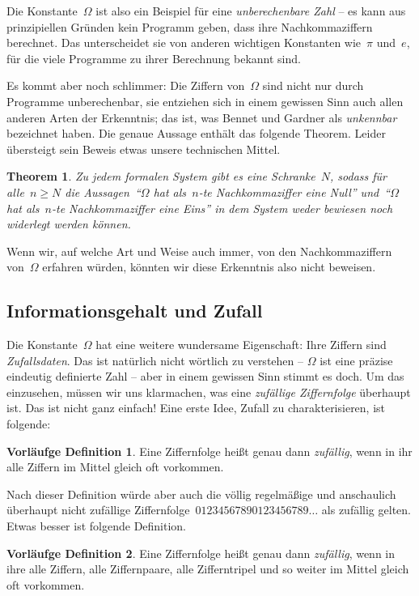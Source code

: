 \documentclass[twoside]{../zirkelblatt1415}
\theoremstyle{definition}
\newtheorem{defn'}{Vorläufge Definition}[section]
\theoremstyle{plain}
\newtheorem{thm}[defn]{Theorem}
\theoremstyle{remark}
\begin{document}
Die Konstante~$\Omega$ ist also ein Beispiel für eine \emph{unberechenbare
Zahl} -- es kann aus prinzipiellen Gründen kein Programm geben, dass ihre
Nachkommaziffern berechnet. Das unterscheidet sie von anderen wichtigen
Konstanten wie~$\pi$ und~$e$, für die viele Programme zu ihrer Berechnung
bekannt sind.

Es kommt aber noch schlimmer: Die Ziffern von~$\Omega$ sind nicht nur durch
Programme unberechenbar, sie entziehen sich in einem gewissen Sinn auch allen
anderen Arten der Erkenntnis; das ist, was Bennet und Gardner als
\emph{unkennbar} bezeichnet haben. Die genaue Aussage enthält das folgende
Theorem. Leider übersteigt sein Beweis etwas unsere technischen Mittel.

\begin{thm}Zu jedem formalen System gibt es eine Schranke~$N$, sodass für
alle~$n \geq N$ die Aussagen~"`$\Omega$ hat als~$n$-te Nachkommaziffer eine
Null"' und~"`$\Omega$ hat als~$n$-te Nachkommaziffer eine Eins"' in dem System
weder bewiesen noch widerlegt werden können.
\end{thm}

Wenn wir, auf welche Art und Weise auch immer, von den Nachkommaziffern
von~$\Omega$ erfahren würden, könnten wir diese Erkenntnis also nicht beweisen.


\subsection{Informationsgehalt und Zufall}

Die Konstante~$\Omega$ hat eine weitere wundersame Eigenschaft: Ihre
Ziffern sind \emph{Zufallsdaten}. Das ist natürlich nicht wörtlich zu verstehen
-- $\Omega$ ist eine präzise eindeutig definierte Zahl -- aber in einem
gewissen Sinn stimmt es doch. Um das einzusehen, müssen wir uns klarmachen, was
eine \emph{zufällige Ziffernfolge} überhaupt ist. Das ist nicht ganz einfach!
Eine erste Idee, Zufall zu charakterisieren, ist folgende:

\begin{defn'}Eine Ziffernfolge heißt genau dann \emph{zufällig}, wenn in ihr alle
Ziffern im Mittel gleich oft vorkommen.\end{defn'}

Nach dieser Definition würde aber auch die völlig regelmäßige und anschaulich
überhaupt nicht zufällige Ziffernfolge~$01234567890123456789\ldots$ als
zufällig gelten. Etwas besser ist folgende Definition.

\begin{defn'}Eine Ziffernfolge heißt genau dann \emph{zufällig}, wenn in ihre alle
Ziffern, alle Ziffernpaare, alle Zifferntripel und so weiter im Mittel gleich
oft vorkommen.\end{defn'}
\end{document}

